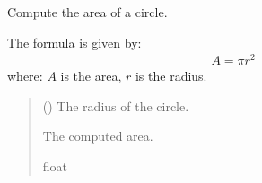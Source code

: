 \documentclass[a4paper,14pt,oneside,english,openany]{sphinxmanual}
\begin{document}
\begin{fulllineitems}
\label{\detokenize{pythagorus:pythagorus.area_of_circle}}
\pysigstartsignatures
{}
\pysigstopsignatures
\sphinxAtStartPar
Compute the area of a circle.

\sphinxAtStartPar
The formula is given by:
\begin{equation*}
\begin{split}A = \pi r^2\end{split}
\end{equation*}
\sphinxAtStartPar
where:
\sphinxhyphen{} \(A\) is the area,
\sphinxhyphen{} \(r\) is the radius.
\begin{quote}\begin{description}
\sphinxAtStartPar
{} () \textendash{} The radius of the circle.

\sphinxAtStartPar
The computed area.

\sphinxAtStartPar
float

\end{description}\end{quote}

\end{fulllineitems}

\end{document}
